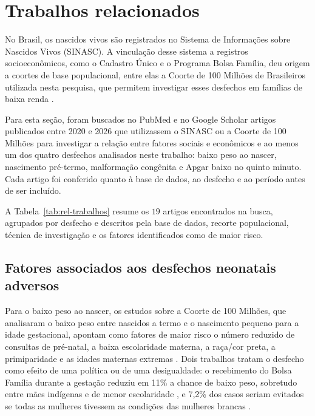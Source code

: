 
\section{Trabalhos relacionados}\label{sec:relacionados}

No Brasil, os nascidos vivos são registrados no Sistema de Informações sobre Nascidos Vivos (SINASC). 
A vinculação desse sistema a registros socioeconômicos, como o Cadastro Único e o Programa Bolsa Família, deu origem a coortes de base populacional, entre elas a Coorte de 100 Milhões de Brasileiros utilizada nesta pesquisa, que permitem investigar esses desfechos em famílias de baixa renda \cite{pita2018}.

Para esta seção, foram buscados no PubMed e no Google Scholar artigos publicados entre 2020 e 2026 que utilizassem o SINASC ou a Coorte de 100 Milhões para investigar a relação entre fatores sociais e econômicos e ao menos um dos quatro desfechos analisados neste trabalho: baixo peso ao nascer, nascimento pré-termo, malformação congênita e Apgar baixo no quinto minuto. 
Cada artigo foi conferido quanto à base de dados, ao desfecho e ao período antes de ser incluído. 

A Tabela~\ref{tab:rel-trabalhos} resume os $19$ artigos encontrados na busca, agrupados por desfecho e descritos pela base de dados, recorte populacional, técnica de investigação e os fatores identificados como de maior risco.



\subsection{Fatores associados aos desfechos neonatais adversos}\label{subsec:rel-desfechos}

Para o baixo peso ao nascer, os estudos sobre a Coorte de 100 Milhões, que analisaram o baixo peso entre nascidos a termo e o nascimento pequeno para a idade gestacional, apontam como fatores de maior risco o número reduzido de consultas de pré-natal, a baixa escolaridade materna, a raça/cor preta, a primiparidade e as idades maternas extremas \cite{falcao2020,falcao2021}. Dois trabalhos tratam o desfecho como efeito de uma política ou de uma desigualdade: o recebimento do Bolsa Família durante a gestação reduziu em 11\% a chance de baixo peso, sobretudo entre mães indígenas e de menor escolaridade \cite{falcao2023}, e 7,2\% dos casos seriam evitados se todas as mulheres tivessem as condições das mulheres brancas \cite{reboucas2024}.

